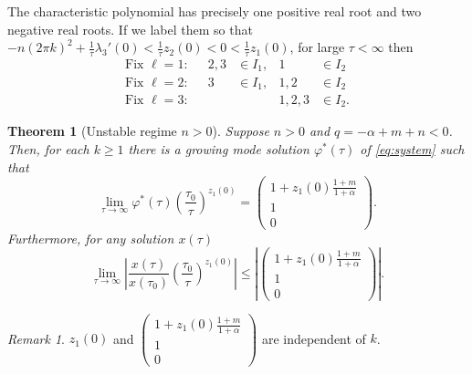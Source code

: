 \documentclass[a4paper,11pt]{article}
\newtheorem{theorem}{Theorem}
\theoremstyle{remark}
\newtheorem{remark}{Remark}[section]
\begin{document}
The characteristic polynomial has precisely one positive real root and two negative real roots. If we label them so that
$-n(2\pi k)^2 + \frac{1}{\tau}\lambda_3'(0)<\frac{1}{\tau}z_2(0)<0<\frac{1}{\tau}z_1(0)$, for large $\tau<\infty$ then
\begin{align*}
  \text{Fix $\ell=1$:}&& 2,3&\in I_1, & 1&\in I_2\\
  \text{Fix $\ell=2$:}&& 3&\in I_1, & 1,2&\in I_2\\
  \text{Fix $\ell=3$:}&& & & 1,2,3&\in I_2.
\end{align*}

\begin{theorem}[Unstable regime $n>0$] Suppose $n>0$ and $q=-\alpha+m+n<0$. Then, for each $k\ge1$ there is a growing mode solution $\varphi^*(\tau)$ of \eqref{eq:system} such that
$$\lim_{\tau \rightarrow \infty} \varphi^*(\tau)\left(\frac{\tau_0}{\tau}\right)^{z_1(0)} = \begin{pmatrix} 1+z_1(0)\frac{1+m}{1+\alpha}\\1\\0\end{pmatrix}.$$
Furthermore, for any solution $x(\tau)$
$$\lim_{\tau \rightarrow \infty} \left|\frac{x(\tau)}{x(\tau_0)}\left(\frac{\tau_0}{\tau}\right)^{z_1(0)}\right| \le \left|\begin{pmatrix} 1+z_1(0)\frac{1+m}{1+\alpha}\\1\\0\end{pmatrix}\right|.$$
\end{theorem}
\begin{remark}
$z_1(0)$ and $\begin{pmatrix} 1+z_1(0)\frac{1+m}{1+\alpha}\\1\\0\end{pmatrix}$ are independent of $k$. 
\end{remark}
\end{document}
